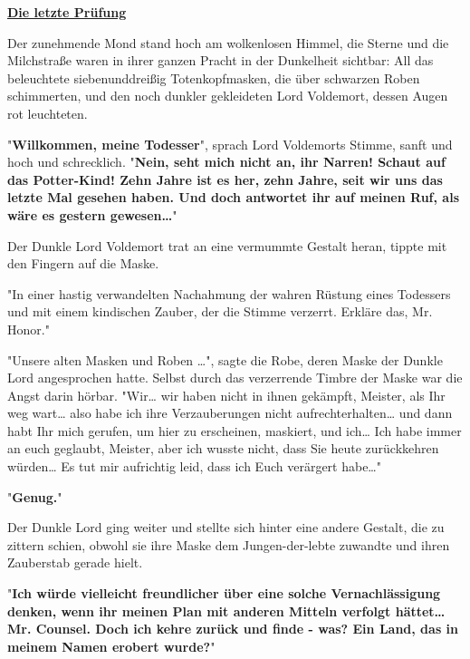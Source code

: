 

\hypertarget{die-letzte-pruxfcfung}{%

\textbf{\uline{Die letzte Prüfung}}

Der zunehmende Mond stand hoch am wolkenlosen Himmel, die Sterne und die Milchstraße waren in ihrer ganzen Pracht in der Dunkelheit sichtbar: All das beleuchtete siebenunddreißig Totenkopfmasken, die über schwarzen Roben schimmerten, und den noch dunkler gekleideten Lord Voldemort, dessen Augen rot leuchteten.

"\textbf{Willkommen, meine Todesser}", sprach Lord Voldemorts Stimme, sanft und hoch und schrecklich. "\textbf{Nein, seht mich nicht an, ihr Narren! Schaut auf das Potter-Kind! Zehn Jahre ist es her, zehn Jahre, seit wir uns das letzte Mal gesehen haben. Und doch antwortet ihr auf meinen Ruf, als wäre es gestern gewesen…}"

Der Dunkle Lord Voldemort trat an eine vermummte Gestalt heran, tippte mit den Fingern auf die Maske.

"In einer hastig verwandelten Nachahmung der wahren Rüstung eines Todessers und mit einem kindischen Zauber, der die Stimme verzerrt. Erkläre das, Mr. Honor."

"Unsere alten Masken und Roben …", sagte die Robe, deren Maske der Dunkle Lord angesprochen hatte. Selbst durch das verzerrende Timbre der Maske war die Angst darin hörbar. "Wir… wir haben nicht in ihnen gekämpft, Meister, als Ihr weg wart… also habe ich ihre Verzauberungen nicht aufrechterhalten… und dann habt Ihr mich gerufen, um hier zu erscheinen, maskiert, und ich… Ich habe immer an euch geglaubt, Meister, aber ich wusste nicht, dass Sie heute zurückkehren würden… Es tut mir aufrichtig leid, dass ich Euch verärgert habe…"

"\textbf{Genug.}"

Der Dunkle Lord ging weiter und stellte sich hinter eine andere Gestalt, die zu zittern schien, obwohl sie ihre Maske dem Jungen-der-lebte zuwandte und ihren Zauberstab gerade hielt.

"\textbf{Ich würde vielleicht freundlicher über eine solche Vernachlässigung denken, wenn ihr meinen Plan mit anderen Mitteln verfolgt hättet… Mr. Counsel. Doch ich kehre zurück und finde - was? Ein Land, das in meinem Namen erobert wurde?}"

}

